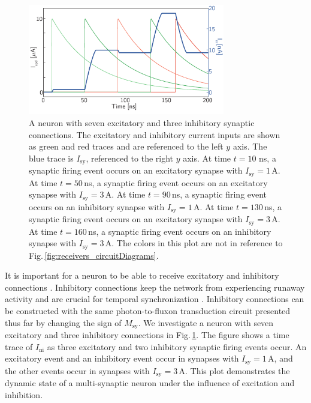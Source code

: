 \documentclass[aip,amsmath,amssymb,reprint,nofootinbib]{revtex4-1}
\begin{document}
\begin{figure}[t!]
	\centerline{\includegraphics[width=8.6cm]{_receivers_inhibitoryAndExcitatory_small.pdf}}
	\caption{\label{fig:receivers_inhibitoryAndExcitatory}A neuron with seven excitatory and three inhibitory synaptic connections. The excitatory and inhibitory current inputs are shown as green and red traces and are referenced to the left $y$ axis. The blue trace is $I_{\mathrm{sy}}$, referenced to the right $y$ axis. At time $t = 10$ ns, a synaptic firing event occurs on an excitatory synapse with $I_{\mathrm{sy}} = 1$\,\textmu A. At time $t = 50$\,ns, a synaptic firing event occurs on an excitatory synapse with $I_{\mathrm{sy}} = 3$\,\textmu A. At time $t = 90$\,ns, a synaptic firing event occurs on an inhibitory synapse with $I_{\mathrm{sy}} = 1$\,\textmu A. At time $t = 130$\,ns, a synaptic firing event occurs on an excitatory synapse with $I_{\mathrm{sy}} = 3$\,\textmu A. At time $t = 160$\,ns, a synaptic firing event occurs on an inhibitory synapse with $I_{\mathrm{sy}} = 3$\,\textmu A. The colors in this plot are not in reference to Fig.\,\ref{fig:receivers_circuitDiagrams}.}
\end{figure}
It is important for a neuron to be able to receive excitatory and inhibitory connections \cite{vrso1996,sase2000,daab2001,robu2015}. Inhibitory connections keep the network from experiencing runaway activity and are crucial for temporal synchronization \cite{sase2001,vala2001,enfr2001,budr2004,bu2006}. Inhibitory connections can be constructed with the same photon-to-fluxon transduction circuit presented thus far by changing the sign of $M_{\mathrm{sy}}$. We investigate a neuron with seven excitatory and three inhibitory connections in Fig.\,\ref{fig:receivers_inhibitoryAndExcitatory}. The figure shows a time trace of $I_{\mathrm{ni}}$ as three excitatory and two inhibitory synaptic firing events occur. An excitatory event and an inhibitory event occur in synapses with $I_{\mathrm{sy}} = 1$\,\textmu A, and the other events occur in synapses with $I_{\mathrm{sy}} = 3$\,\textmu A. This plot demonstrates the dynamic state of a multi-synaptic neuron under the influence of excitation and inhibition. 
\end{document}
